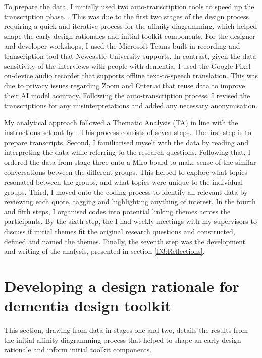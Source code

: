 To prepare the data, I initially used two auto-transcription tools to speed up the transcription phase. . This was due to the first two stages of the design process requiring a quick and iterative process for the affinity diagramming, which helped shape the early design rationales and initial toolkit components. For the designer and developer workshops, I used the Microsoft Teams built-in recording and transcription tool that Newcastle University supports. In contrast, given the data sensitivity of the interviews with people with dementia, I used the Google Pixel on-device audio recorder that supports offline text-to-speech translation. This was due to privacy issues regarding Zoom and Otter.ai that reuse data to improve their AI model accuracy. Following the auto-transcription process, I revised the transcriptions for any misinterpretations and added any necessary anonymisation. 

My analytical approach followed a Thematic Analysis (TA) in line with the instructions set out by  \cite{braun_using_2006,braun_one_2020}. This process consists of seven steps. The first step is to prepare transcripts. Second,  I familiarised myself with the data by reading and interpreting the data while referring to the research questions. Following that, I ordered the data from stage three onto a Miro board to make sense of the similar conversations between the different groups. This helped to explore what topics resonated between the groups, and what topics were unique to the individual groups. Third, I moved onto the coding process to identify all relevant data by reviewing each quote, tagging and highlighting anything of interest. In the fourth and fifth steps, I organised codes into potential linking themes across the participants. By the sixth step, the I had weekly meetings with my supervisors to discuss if initial themes fit the original research questions and constructed, defined and named the themes. Finally, the seventh step was the development and writing of the analysis, presented in section \ref{D3:Reflections}.

\section{Developing a design rationale for dementia design toolkit}
\label{D3:Rationale}
This section, drawing from data in stages one and two, details the results from the initial affinity diagramming process that helped to shape an early design rationale and inform initial toolkit components.

